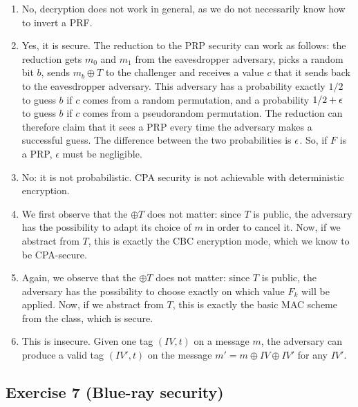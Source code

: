 \begin{solution}
	\begin{enumerate}
		\item No, decryption does not work in general, as we do not
		necessarily know how to invert a PRF.

		\item 	Yes, it is secure.  The reduction to the PRP security can work as follows:
		the reduction gets $m_0$ and $m_1$ from the eavesdropper
		adversary, picks a random bit $b$, sends $m_b \oplus T$ to the
		challenger and receives a value $c$ that it sends back to the eavesdropper
		adversary. This adversary has a probability exactly $1/2$ to
		guess $b$ if $c$ comes from a random permutation, and a
		probability $1/2 + \epsilon$ to guess $b$ if $c$ comes from a
		pseudorandom permutation. The reduction can therefore claim that
		it sees a PRP every time the adversary makes a successful
		guess. The difference between the two probabilities is $\epsilon$.
		So, if $F$ is a PRP, $\epsilon$ must be negligible.

		\item 	No: it is not probabilistic. CPA security is not achievable with deterministic encryption.

		\item We first observe that the $\oplus T$ does not matter:
		since $T$ is public, the adversary has the possibility to adapt
		its choice of $m$ in order to cancel it.  Now, if we abstract
		from $T$, this is exactly the CBC encryption mode, which we know
		to be CPA-secure.

		\item Again, we observe that the $\oplus T$ does not matter: since
		$T$ is public, the adversary has the possibility to choose exactly
		on which value $F_k$ will be applied. Now, if we abstract from $T$,
		this is exactly the basic MAC scheme from the class, which is secure.

		\item This is insecure. Given one tag $(IV, t)$ on a message
		$m$, the adversary can produce a valid tag $(IV', t)$ on the
		message $m' = m \oplus IV \oplus IV'$ for any $IV'$.
	\end{enumerate}
\end{solution}



\subsection{Exercise 7 (Blue-ray security)}

